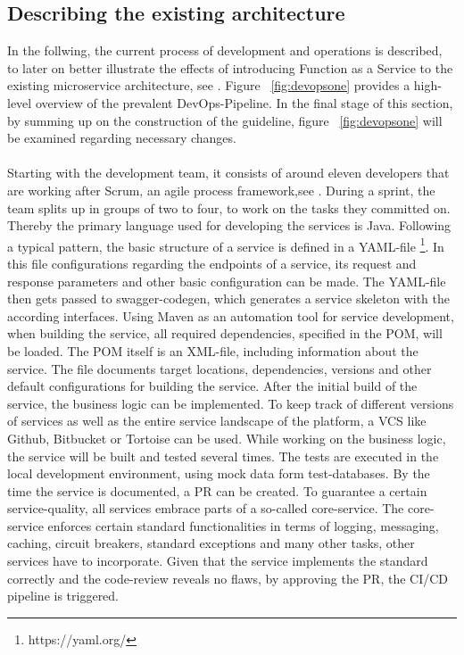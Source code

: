 \documentclass[a4paper,twoside,11pt, pagesize]{scrartcl}
\begin{document}
\subsection{Describing the existing architecture}
In the follwing, the current process of development and operations is described, to later on better illustrate the effects of introducing Function as a Service to the existing microservice architecture, see \cite{newman2015building}. Figure ~\ref{fig:devopsone} provides a high-level overview of the prevalent DevOps-Pipeline. In the final stage of this section, by summing up on the construction of the guideline, figure ~\ref{fig:devopsone} will be examined regarding necessary changes.\\\\ Starting with the development team, it consists of around eleven developers that are working after Scrum, an agile process framework,see \cite{pichler2013scrum}. During a sprint, the team splits up in groups of two to four, to work on the tasks they committed on. Thereby the primary language used for developing the services is Java. Following a typical pattern, the basic structure of a service is defined in a YAML-file \footnote{https://yaml.org/}. In this file configurations regarding the endpoints of a service, its request and response parameters and other basic configuration can be made. The YAML-file then gets passed to swagger-codegen, which generates a service skeleton with the according interfaces. Using Maven as an automation tool for service development, when building the service, all required dependencies, specified in the POM, will be loaded. The POM itself is an XML-file, including information about the service. The file documents target locations, dependencies, versions and other default configurations for building the service. After the initial build of the service, the business logic can be implemented. To keep track of different versions of services as well as the entire service landscape of the platform, a VCS like Github, Bitbucket or Tortoise can be used. While working on the business logic, the service will be built and tested several times. The tests are executed in the local development environment, using mock data form test-databases. By the time the service is documented, a PR can be created. To guarantee a certain service-quality, all services embrace parts of a so-called core-service. The core-service enforces certain standard functionalities in terms of logging, messaging, caching, circuit breakers, standard exceptions and many other tasks, other services have to incorporate. Given that the service implements the standard correctly and the code-review reveals no flaws, by approving the PR, the CI/CD pipeline is triggered.    
\end{document}

